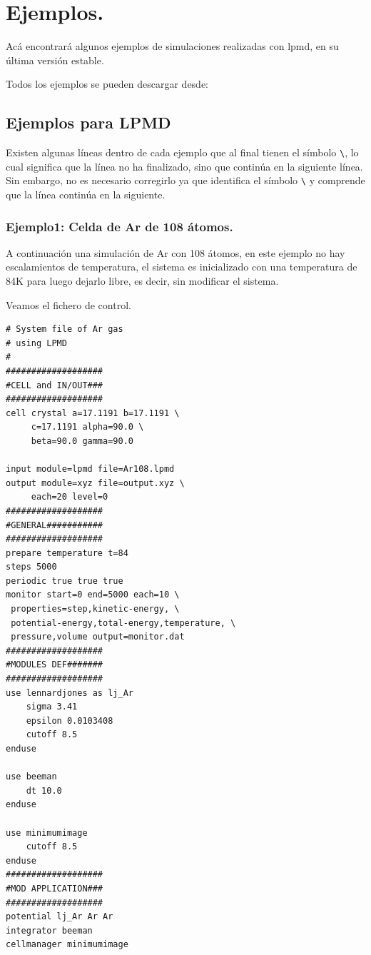 \chapter{Ejemplos.}
\label{chap:exa}

Ac\'a encontrar\'a algunos ejemplos de simulaciones realizadas con lpmd, en su \'ultima versi\'on estable.

Todos los ejemplos se pueden descargar desde:



\section{Ejemplos para LPMD}

Existen algunas l\'ineas dentro de cada ejemplo que al final tienen el s\'imbolo \verb|\|, lo cual significa que la l\'inea no ha finalizado, sino que contin\'ua en la siguiente l\'inea. Sin embargo, no es necesario corregirlo ya que {\lpmd} identifica el s\'imbolo \verb|\| y comprende que la l\'inea contin\'ua en la siguiente. 

\subsection{Ejemplo1: Celda de Ar de 108 \'atomos.}

A continuaci\'on una simulaci\'on de Ar con 108 \'atomos, en este ejemplo no hay escalamientos de temperatura, el sistema es inicializado con una temperatura de 84K para luego dejarlo libre, es decir, sin modificar el sistema.

Veamos el fichero de control.

\begin{multicols}{2}
\setlength{\columnseprule}{.5pt}
\begin{verbatim}
# System file of Ar gas 
# using LPMD
#
###################
#CELL and IN/OUT###
###################
cell crystal a=17.1191 b=17.1191 \
     c=17.1191 alpha=90.0 \
     beta=90.0 gamma=90.0

input module=lpmd file=Ar108.lpmd
output module=xyz file=output.xyz \
     each=20 level=0
###################
#GENERAL###########
###################
prepare temperature t=84
steps 5000
periodic true true true
monitor start=0 end=5000 each=10 \
 properties=step,kinetic-energy, \
 potential-energy,total-energy,temperature, \
 pressure,volume output=monitor.dat
###################
#MODULES DEF#######
###################
use lennardjones as lj_Ar
    sigma 3.41
    epsilon 0.0103408
    cutoff 8.5
enduse

use beeman
    dt 10.0
enduse

use minimumimage
    cutoff 8.5
enduse
###################
#MOD APPLICATION###
###################
potential lj_Ar Ar Ar
integrator beeman
cellmanager minimumimage
\end{verbatim}
\end{multicols}


